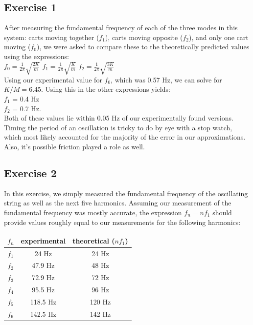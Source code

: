 \documentclass[a4paper,12pt]{article}
\begin{document}
\subsection{Exercise 1}
After measuring the fundamental frequency of each of the three modes
in this system: carts moving together ($f_1$), carts moving opposite
($f_2$), and only one cart moving ($f_0$), we were asked to compare these
to the theoretically predicted values using the expressions: \\

$f_0 = \frac{1}{2\pi}\sqrt{ \frac{2K}{m} }$
$f_1 = \frac{1}{2\pi}\sqrt{ \frac{K}{m} }$
$f_2 = \frac{1}{2\pi}\sqrt{ \frac{3K}{m} }$ \\

Using our experimental value for $f_0$, which was 0.57 Hz, we can solve
for $K/M = 6.45$. Using this in the other expressions yields: \\

$f_1$ = 0.4 Hz \\ 
$f_2$ = 0.7 Hz. \\

Both of these values lie within 0.05 Hz of our experimentally found
versions. Timing the period of an oscillation is tricky to do by eye
with a stop watch, which most likely accounted for the majority of the
error in our approximations. Also, it's possible friction played a
role as well.

\newpage

\subsection{Exercise 2}
In this exercise, we simply measured the fundamental frequency of the
oscillating string as well as the next five harmonics. Assuming our
measurement of the fundamental frequency was mostly accurate, the
expression $f_n = nf_1$ should provide values roughly equal to our
measurements for the following harmonics:

\vspace{0.5cm}

\begin{tabular}{c | c | c}
  $f_n$ & experimental & theoretical ($nf_1$) \\
  \hline
  $f_1$ & 24 Hz & 24 Hz\\
  $f_2$ & 47.9 Hz & 48 Hz \\
  $f_3$ & 72.9 Hz & 72 Hz \\
  $f_4$ & 95.5 Hz & 96 Hz \\
  $f_5$ & 118.5 Hz & 120 Hz \\
  $f_6$ & 142.5 Hz & 142 Hz \\
\end{tabular} 
\end{document}
